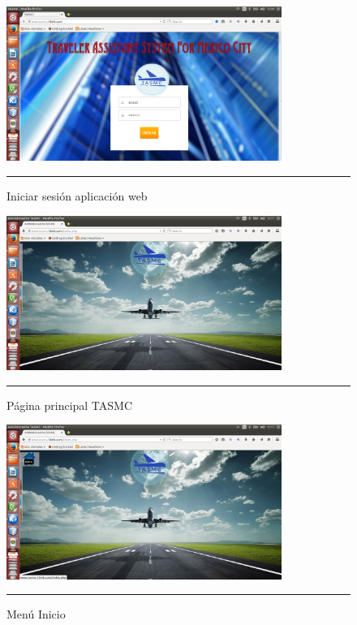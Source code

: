 \begin{figure}[h!]
	\centering
		\includegraphics[width=0.8\textwidth]{Figuras/principalTASMC.png}
		\rule{35em}{0.5pt}
	\caption[Iniciar sesión aplicación web]{Iniciar sesión aplicación web}
	\label{fig:vistaInicio}
\end{figure}
\clearpage

\begin{figure}[h!]
	\centering
		\includegraphics[width=0.8\textwidth]{Figuras/index.png}
		\rule{35em}{0.5pt}
	\caption[Página principal TASMC]{Página principal TASMC}
	\label{fig:indexWeb}
\end{figure}
\begin{figure}[h!]
	\centering
		\includegraphics[width=0.8\textwidth]{Figuras/indexhome.png}
		\rule{35em}{0.5pt}
	\caption[Menú Inicio]{Menú Inicio}
	\label{fig:menuInicio}
\end{figure}
\clearpage

